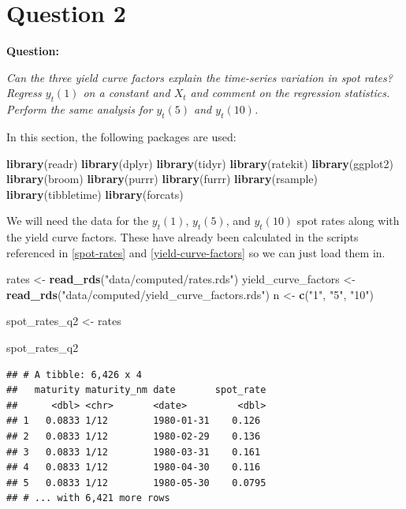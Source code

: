 \documentclass[]{book}
\newenvironment{Shaded}{\begin{snugshade}}{\end{snugshade}}
\newcommand{\KeywordTok}[1]{\textcolor[rgb]{0.13,0.29,0.53}{\textbf{#1}}}
\newcommand{\NormalTok}[1]{#1}
\newcommand{\StringTok}[1]{\textcolor[rgb]{0.31,0.60,0.02}{#1}}
\theoremstyle{definition}
\theoremstyle{definition}
\theoremstyle{definition}
\theoremstyle{remark}
\begin{document}
\hypertarget{q2}{%
\chapter{Question 2}\label{q2}}

\textbf{Question:}

\emph{Can the three yield curve factors explain the time-series
variation in spot rates? Regress \(y_t(1)\) on a constant and \(X_t\)
and comment on the regression statistics. Perform the same analysis for
\(y_t(5)\) and \(y_t(10)\).}

In this section, the following packages are used:

\begin{Shaded}
\begin{Highlighting}[]
\KeywordTok{library}\NormalTok{(readr)}
\KeywordTok{library}\NormalTok{(dplyr)}
\KeywordTok{library}\NormalTok{(tidyr)}
\KeywordTok{library}\NormalTok{(ratekit)}
\KeywordTok{library}\NormalTok{(ggplot2)}
\KeywordTok{library}\NormalTok{(broom)}
\KeywordTok{library}\NormalTok{(purrr)}
\KeywordTok{library}\NormalTok{(furrr)}
\KeywordTok{library}\NormalTok{(rsample)}
\KeywordTok{library}\NormalTok{(tibbletime)}
\KeywordTok{library}\NormalTok{(forcats)}
\end{Highlighting}
\end{Shaded}

We will need the data for the \(y_t(1)\), \(y_t(5)\), and \(y_t(10)\)
spot rates along with the yield curve factors. These have already been
calculated in the scripts referenced in \ref{spot-rates} and
\ref{yield-curve-factors} so we can just load them in.

\begin{Shaded}
\begin{Highlighting}[]
\NormalTok{rates    <-}\StringTok{ }\KeywordTok{read_rds}\NormalTok{(}\StringTok{"data/computed/rates.rds"}\NormalTok{)}
\NormalTok{yield_curve_factors <-}\StringTok{ }\KeywordTok{read_rds}\NormalTok{(}\StringTok{"data/computed/yield_curve_factors.rds"}\NormalTok{)}
\NormalTok{n <-}\StringTok{ }\KeywordTok{c}\NormalTok{(}\StringTok{"1"}\NormalTok{, }\StringTok{"5"}\NormalTok{, }\StringTok{"10"}\NormalTok{)}

\NormalTok{spot_rates_q2 <-}\StringTok{ }\NormalTok{rates}

\NormalTok{spot_rates_q2}
\end{Highlighting}
\end{Shaded}

\begin{verbatim}
## # A tibble: 6,426 x 4
##   maturity maturity_nm date       spot_rate
##      <dbl> <chr>       <date>         <dbl>
## 1   0.0833 1/12        1980-01-31    0.126 
## 2   0.0833 1/12        1980-02-29    0.136 
## 3   0.0833 1/12        1980-03-31    0.161 
## 4   0.0833 1/12        1980-04-30    0.116 
## 5   0.0833 1/12        1980-05-30    0.0795
## # ... with 6,421 more rows
\end{verbatim}
\end{document}
